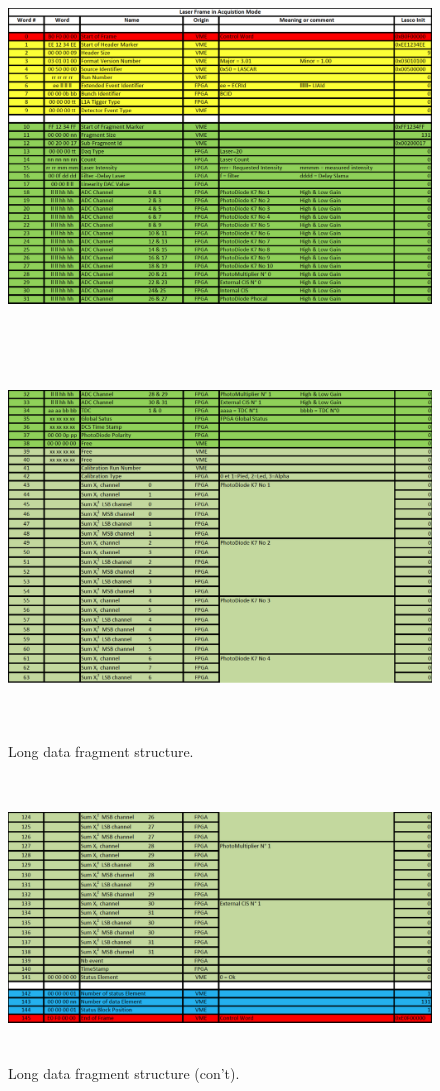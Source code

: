 \begin{appendices}
\begin{figure}[htbp]
\centering
\includegraphics[height=10cm]{figures/long_fragment_1.pdf}
\includegraphics[height=9.9cm]{figures/long_fragment_2.pdf}
\caption{Long data fragment structure.}\label{fig:longfraga}
\end{figure}

\begin{figure}[htbp]
\centering
\includegraphics[height=7.5cm]{figures/long_fragment_3.pdf}
\caption{Long data fragment structure (con't).}\label{fig:longfragb}
\end{figure}


\end{appendices}
